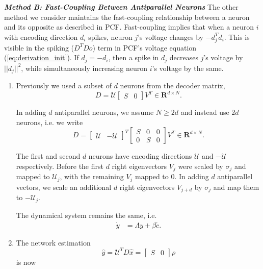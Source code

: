 \clearpage

\textbf{\textit{Method B: Fast-Coupling Between Antiparallel Neurons}} The other method we consider maintains the fast-coupling relationship between a neuron and its opposite as described in PCF. Fast-coupling implies that when a neuron $i$ with encoding direction $d_i$ spikes, neuron $j$'s voltage changes by $-d_j^T d_i$. This is visible in the spiking ($D^TDo$) term in PCF's voltage equation (\ref{eq:derivation_init}). If $d_j = -d_i$, then a spike in $d_j$ decreases $j$'s voltage by $||d_j||^2$, while simultaneously increasing neuron $i$'s voltage by the same. 

\begin{enumerate}



\item  Previously we used a subset of $d$ neurons from the decoder matrix, 
$$
D = \mathcal{U} \begin{bmatrix}
S & 0
\end{bmatrix}
V^T \in \mathbf{R}^{d \times N}.
$$

In adding $d$ antiparallel neurons, we assume $N \geq 2d$ and instead use $2d$ neurons, i.e. we write
$$
D = \begin{bmatrix}
\mathcal{U} & -\mathcal{U}
\end{bmatrix}^T \begin{bmatrix}
S & 0 & 0
\\
0 & S & 0
\end{bmatrix}
V^T \in \mathbf{R}^{d \times N}.
$$

The first and second $d$ neurons have encoding directions $\mathcal{U}$ and $-\mathcal{U}$ respectively. Before the first $d$ right eigenvectors $V_j$ were scaled by $\sigma_j$ and mapped to $\mathcal{U}_j$, with the remaining $V_j$ mapped to $0$. In adding $d$ antiparallel vectors, we scale an additional $d$ right eigenvectors $V_{j+d}$ by $\sigma_j$ and map them to $-\mathcal{U}_j$. 


The dynamical system remains the same, i.e.
\begin{align*}
\dot{y} &= \Lambda y + \beta \tilde{c}. 
\end{align*}






\item The network estimation 
$$
\hat{y}  = \mathcal{U}^T D \hat{x} = \begin{bmatrix}
S & 0
\end{bmatrix} \rho
$$
is now


\end{enumerate}

